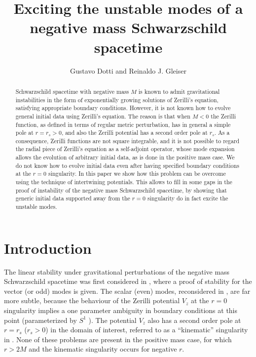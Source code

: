 \documentclass[aps,floats,showpacs,amssymb,tightenlines]{revtex4}
\begin{document}
\title{Exciting the unstable modes of a negative mass Schwarzschild spacetime}

\author{Gustavo Dotti and Reinaldo J. Gleiser}


\begin{abstract}
Schwarzschild spacetime with negative mass $M$ is known to admit gravitational instabilities
in the form of exponentially growing solutions
of Zerilli's equation, satisfying appropriate boundary conditions.
However, it is not known how to evolve general initial data using Zerilli's equation.
The reason is that when $M<0$ the Zerilli function, as defined in terms of regular metric perturbation,
has in general a simple pole at $r=r_s>0$, and also the
 Zerilli potential has
a second order pole at $r_s$. As a consequence, Zerilli functions are not square integrable,
and it is not possible to regard the  radial piece
 of Zerilli's equation as  a self-adjoint  operator, whose mode
expansion allows
the evolution of arbitrary initial data, as is done in the positive mass case. We do not know
 how to evolve
initial data even after having specified  boundary conditions at the $r=0$ singularity. In this paper we show
how this problem can be overcome using the technique of intertwining potentials. This allows
 to fill in some gaps in the proof of instability of the negative mass Schwarzschild spacetime,
 by showing that generic initial
data supported away from the $r=0$ singularity do in fact excite the unstable modes.
 \end{abstract}



\maketitle

\section{Introduction}
The linear stability under gravitational perturbations of the negative mass Schwarzschild
spacetime was first considered in \cite{ghi}, where a proof of stability for the
vector (or odd) modes is given. The scalar (even) modes, reconsidered in \cite{dg},  are far more subtle,
because the behaviour of the Zerilli potential $V_z$ \cite{zerilli,ki} at the $r=0$ singularity implies
a one parameter ambiguity in boundary conditions at this point (parameterized by $S^1$ \cite{ghi}).
 The potential $V_z$ also has
a second order pole at $r=r_s$ ($r_s > 0$) in the domain of interest, referred to
as a ``kinematic'' singularity in \cite{dg}. None of these problems
are present in the positive mass case, for which $r > 2M$ and the kinematic singularity occurs for negative $r$.
\end{document}
